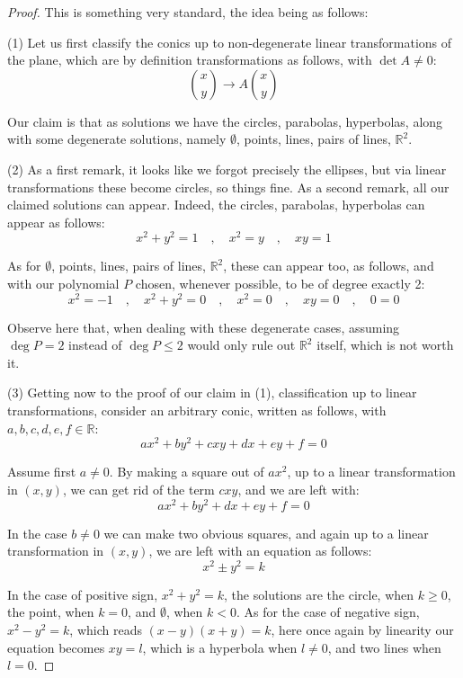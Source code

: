 \documentclass[12pt]{amsbook}
\begin{document}
\begin{proof}
This is something very standard, the idea being as follows:

\medskip

(1) Let us first classify the conics up to non-degenerate linear transformations of the plane, which are by definition transformations as follows, with $\det A\neq0$:
$$\binom{x}{y}\to A\binom{x}{y}$$

Our claim is that as solutions we have the circles, parabolas, hyperbolas, along with some degenerate solutions, namely $\emptyset$, points, lines, pairs of lines, $\mathbb R^2$.

\medskip

(2) As a first remark, it looks like we forgot precisely the ellipses, but via linear transformations these become circles, so things fine. As a second remark, all our claimed solutions can appear. Indeed, the circles, parabolas, hyperbolas can appear as follows:
$$x^2+y^2=1\quad,\quad x^2=y\quad,\quad xy=1$$

As for $\emptyset$, points, lines, pairs of lines, $\mathbb R^2$, these can appear too, as follows, and with our polynomial $P$ chosen, whenever possible, to be of degree exactly 2:
$$x^2=-1\quad,\quad x^2+y^2=0\quad,\quad x^2=0\quad,\quad xy=0\quad,\quad 0=0$$

Observe here that, when dealing with these degenerate cases, assuming $\deg P=2$ instead of $\deg P\leq 2$ would only rule out $\mathbb R^2$ itself, which is not worth it. 

\medskip

(3) Getting now to the proof of our claim in (1), classification up to linear transformations, consider an arbitrary conic, written as follows, with $a,b,c,d,e,f\in\mathbb R$:
$$ax^2+by^2+cxy+dx+ey+f=0$$

Assume first $a\neq0$. By making a square out of $ax^2$, up to a linear transformation in $(x,y)$, we can get rid of the term $cxy$, and we are left with:
$$ax^2+by^2+dx+ey+f=0$$

In the case $b\neq0$ we can make two obvious squares, and again up to a linear transformation in $(x,y)$, we are left with an equation as follows:
$$x^2\pm y^2=k$$

In the case of positive sign, $x^2+y^2=k$, the solutions are the circle, when $k\geq0$, the point, when $k=0$, and $\emptyset$, when $k<0$. As for the case of negative sign, $x^2-y^2=k$, which reads $(x-y)(x+y)=k$, here once again by linearity our equation becomes $xy=l$, which is a hyperbola when $l\neq0$, and two lines when $l=0$.


\end{proof}
\end{document}
